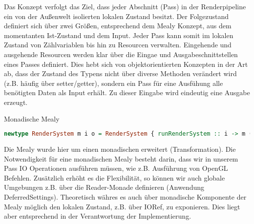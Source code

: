 Das Konzept verfolgt das Ziel, dass jeder Abschnitt (Pass) in der Renderpipeline ein von der Außenwelt isolierten lokalen Zustand besitzt. Der Folgezustand definiert sich über zwei Größen, entsprechend dem Mealy Konzept, aus dem momentanten Ist-Zustand und dem Input. Jeder Pass kann somit im lokalen Zustand von Zählvariablen bis hin zu Resourcen verwalten. Eingehende und ausgehende Resourcen werden klar über die Eingae und Ausgabeschnittstellen eines Passes definiert. Dies hebt sich von objektorientierten Konzepten in der Art ab, dass der Zustand des Typens nicht über diverse Methoden verändert wird (z.B. häufig über setter/getter), sondern ein Pass für eine Ausfühung alle benötigten Daten als Input erhält. Zu dieser Eingabe wird eindeutig eine Ausgabe erzeugt.

Monadische Mealy
\begin{lstlisting}[language=Haskell]
newtype RenderSystem m i o = RenderSystem { runRenderSystem :: i -> m (o, RenderSystem m i o) }
\end{lstlisting}

Die Mealy wurde hier um einen monadischen erweitert (Transformation). Die Notwendigkeit für eine monadischen Mealy besteht darin, dass wir in unserem Pass IO Operationen ausführen müssen, wie z.B. Ausführung von OpenGL Befehlen. Zusätzlich erhöht es die Flexibilität, so können wir auch globale Umgebungen z.B. über die Reader-Monade definieren (Anwendung DeferredSettings). Theoretisch währes es auch über monadische Komponente der Mealy möglich den lokalen Zustand, z.B. über IORef, zu exponieren. Dies liegt aber entsprechend in der Verantwortung der Implementierung.